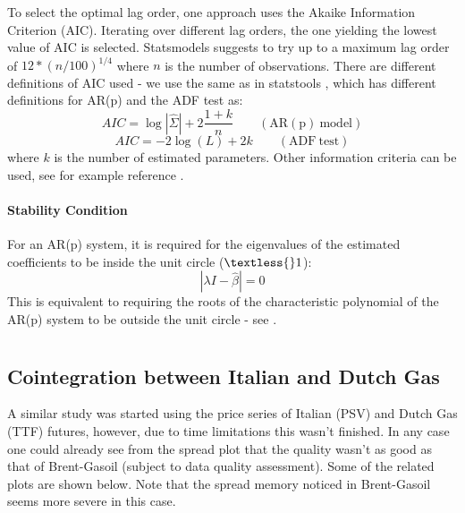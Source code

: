 \documentclass[11pt]{article}
\begin{document}
\begin{appendices}
To select the optimal lag order, one approach uses the Akaike
Information Criterion (AIC). Iterating over different lag orders, the
one yielding the lowest value of AIC is selected. Statsmodels suggests to
try up to a maximum lag order of \(12*(n/100)^{1/4}\) where \(n\) is the
number of observations.
There are different definitions of AIC used - we use the same as in
statstools \cite{statstools},
which has different definitions for AR(p) and the ADF test as:
\begin{equation}
AIC = \log | \hat{\Sigma} |+ 2 \frac{1 + k}{n} \qquad \mathrm{(AR(p) \ model)}
\end{equation}
\begin{equation}
AIC = -2 \log(L) + 2k  \qquad \mathrm{(ADF \ test)} 
\end{equation}
where \(k\) is the number of estimated parameters. Other information
criteria can be used, see for example reference \cite{ref}.

    \subsubsection{Stability Condition}\label{stability-condition}
    
For an AR(p) system, it is required for the eigenvalues of the estimated coefficients to be inside the unit circle ($ \textless{} 1$): \begin{equation}
| \lambda I - \hat{\beta} | = 0
\end{equation} This is equivalent to requiring the roots of the characteristic
polynomial of the AR(p) system to be outside the unit circle - see
 \cite{ref}.

\chapter{} \label{appendixB}

\newpage 
    \section{Cointegration between Italian and Dutch Gas}\label{cointegration-between-italian-and-dutch-gas}
    
    A similar study was started using the price series of Italian (PSV) and Dutch Gas (TTF) futures, however, due to time limitations this wasn't finished. In any case one could already see from the spread plot that the quality wasn't as good as that of Brent-Gasoil (subject to data quality assessment). Some of the related plots are shown below. Note that the spread memory noticed in Brent-Gasoil seems more severe in this case.
    

\end{appendices}
\end{document}

